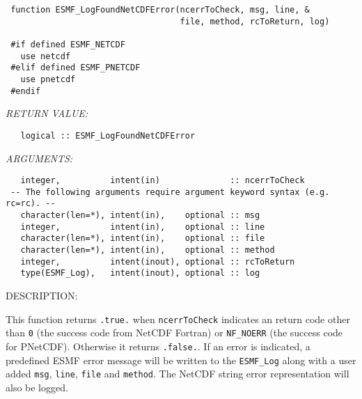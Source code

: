  
\begin{verbatim} function ESMF_LogFoundNetCDFError(ncerrToCheck, msg, line, &
                                   file, method, rcToReturn, log)
 
 #if defined ESMF_NETCDF
   use netcdf
 #elif defined ESMF_PNETCDF
   use pnetcdf
 #endif
 \end{verbatim}{\em RETURN VALUE:}
\begin{verbatim}   logical :: ESMF_LogFoundNetCDFError\end{verbatim}{\em ARGUMENTS:}
\begin{verbatim}   integer,          intent(in)              :: ncerrToCheck
 -- The following arguments require argument keyword syntax (e.g. rc=rc). --
   character(len=*), intent(in),    optional :: msg
   integer,          intent(in),    optional :: line
   character(len=*), intent(in),    optional :: file
   character(len=*), intent(in),    optional :: method
   integer,          intent(inout), optional :: rcToReturn
   type(ESMF_Log),   intent(inout), optional :: log\end{verbatim}
{\sf DESCRIPTION:\\ }


        This function returns {\tt .true.} when {\tt ncerrToCheck} indicates
        an return code other than {\tt 0} (the success code from NetCDF Fortran)
        or {\tt NF\_NOERR} (the success code for PNetCDF). Otherwise it returns
        {\tt .false.}.
        If an error is indicated, a predefined ESMF error message
        will be written to the {\tt ESMF\_Log} along with a user added {\tt msg},
        {\tt line}, {\tt file} and {\tt method}. The NetCDF string error
        representation will also be logged.
  
